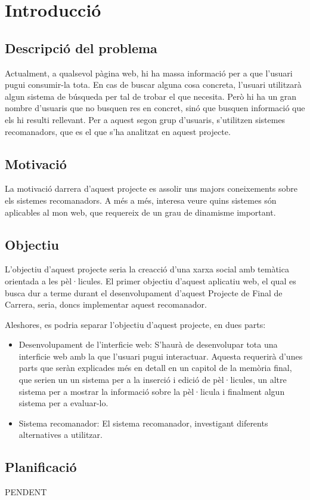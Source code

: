 \chapter{Introducció}
\section{Descripció del problema}

Actualment, a qualsevol pàgina web, hi ha massa informació per a que l'usuari pugui consumir-la tota. En cas de buscar alguna cosa concreta, l'usuari utilitzarà algun sistema de búsqueda per tal de trobar el que necesita. Però hi ha un gran nombre d'usuaris que no busquen res en concret, sinó que busquen informació que els hi resulti rellevant. Per a aquest segon grup d'usuaris, s'utilitzen sistemes recomanadors, que es el que s'ha analitzat en aquest projecte.

\section{Motivació}

La motivació darrera d'aquest projecte es assolir uns majors coneixements sobre els sistemes recomanadors. A més a més, interesa veure quins sistemes són aplicables al mon web, que requereix de un grau de dinamisme important.

\section{Objectiu}

L'objectiu d'aquest projecte seria la creacció d'una xarxa social amb temàtica orientada a les pèl·licules. El primer objectiu d'aquest aplicatiu web, el qual es busca dur a terme durant el desenvolupament d'aquest Projecte de Final de Carrera, seria, doncs implementar aquest recomanador.

Aleshores, es podria separar l'objectiu d'aquest projecte, en dues parts:

\begin{itemize}
\item Desenvolupament de l'interficie web: S'haurà de desenvolupar tota una interficie web amb la que l'usuari pugui interactuar. Aquesta requerirà d'unes parts que seràn explicades més en detall en un capitol de la memòria final, que serien un un sistema per a la inserció i edició de pèl·licules, un altre sistema per a mostrar la informació sobre la pèl·licula i finalment algun sistema per a evaluar-lo.
\item Sistema recomanador: El sistema recomanador, investigant diferents alternatives a utilitzar.
\end{itemize}

\section{Planificació}

PENDENT